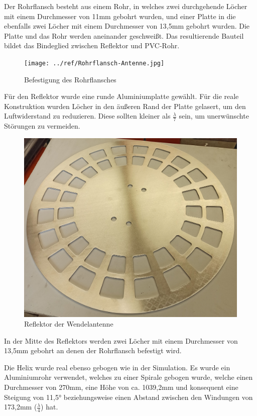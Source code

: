 Der Rohrflansch besteht aus einem Rohr, in welches zwei durchgehende Löcher mit einem Durchmesser von 11mm gebohrt wurden, und einer Platte in die ebenfalls zwei Löcher mit einem Durchmesser von 13,5mm gebohrt wurden. Die Platte und das Rohr werden aneinander geschweißt. Das resultierende Bauteil bildet das Bindeglied zwischen Reflektor und PVC-Rohr.

\begin{figure}[h!]
	\centering
	\texttt{[image: ../ref/Rohrflansch-Antenne.jpg]}
	\caption{Befestigung des Rohrflansches}
	\label{fig:Rohrflansch-Antenne-Verbindung}
\end{figure}

Für den Reflektor wurde eine runde Aluminiumplatte gewählt. Für die reale Konstruktion wurden Löcher in den äußeren Rand der Platte gelasert, um den Luftwiderstand zu reduzieren. Diese sollten kleiner als $\frac{\lambda}{7}$ sein, um unerwünschte Störungen zu vermeiden.

\begin{figure}[h!]
	\centering
	\includegraphics[width=\textwidth]{../ref/Reflektor.jpg}
	\caption{Reflektor der Wendelantenne}
	\label{fig:Reflektor}
\end{figure}

In der Mitte des Reflektors werden zwei Löcher mit einem Durchmesser von 13,5mm gebohrt an denen der Rohrflansch befestigt wird. 

Die Helix wurde real ebenso gebogen wie in der Simulation. Es wurde ein Aluminiumrohr verwendet, welches zu einer Spirale gebogen wurde, welche einen Durchmesser von 270mm, eine Höhe von ca. 1039,2mm und konsequent eine Steigung von 11,5° beziehungsweise einen Abstand zwischen den Windungen von 173,2mm ($\frac{\lambda}{4}$) hat.

